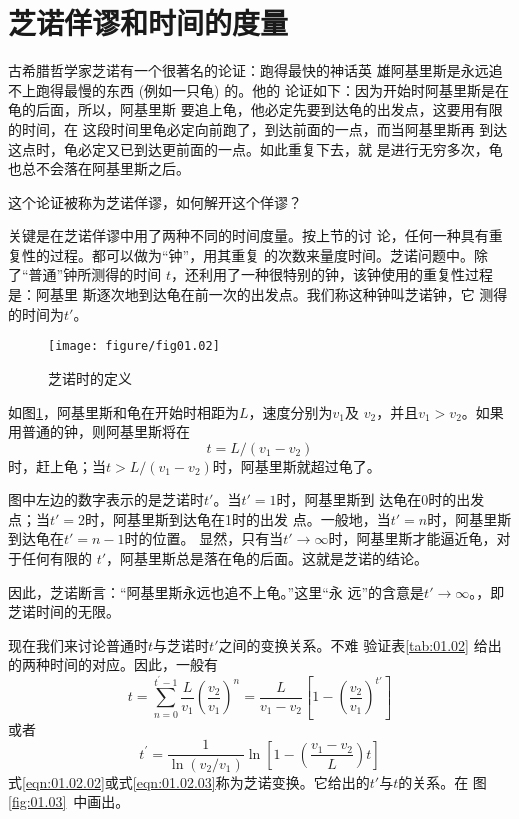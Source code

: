 \documentclass[../outline-of-mechanics.tex]{subfiles}
\begin{document}
\section{芝诺佯谬和时间的度量}\label{sec:01.02}

古希腊哲学家芝诺有一个很著名的论证：跑得最快的神话英
雄阿基里斯是永远追不上跑得最慢的东西 (例如一只龟) 的。他的
论证如下：因为开始时阿基里斯是在龟的后面，所以，阿基里斯
要追上龟，他必定先要到达龟的出发点，这要用有限的时间，在
这段时间里龟必定向前跑了，到达前面的一点，而当阿基里斯再
到达这点时，龟必定又已到达更前面的一点。如此重复下去，就
是进行无穷多次，龟也总不会落在阿基里斯之后。

这个论证被称为芝诺佯谬，如何解开这个佯谬？

关键是在芝诺佯谬中用了两种不同的时间度量。按上节的讨
论，任何一种具有重复性的过程。都可以做为“钟”，用其重复
的次数来量度时间。芝诺问题中。除了“普通”钟所测得的时间
$t$，还利用了一种很特别的钟，该钟使用的重复性过程是：阿基里
斯逐次地到达龟在前一次的出发点。我们称这种钟叫芝诺钟，它
测得的时间为$t'$。

\begin{figure}[!h]
  \centering
  \texttt{[image: figure/fig01.02]}
  \caption{芝诺时的定义}\label{fig:01.02}
\end{figure}

如图\ref{fig:01.02}，阿基里斯和龟在开始时相距为$L$，速度分别为$v_1$及
$v_2$，并且$v_1>v_2$。如果用普通的钟，则阿基里斯将在
\begin{equation}
  t=L/\left(v_1-v_2\right)
  \label{eqn:01.02.01}
\end{equation}
时，赶上龟；当$t>L/\left(v_1-v_2\right)$时，阿基里斯就超过龟了。

图中左边的数字表示的是芝诺时$t'$。当$t'=1$时，阿基里斯到
达龟在0时的出发点；当$t'=2$时，阿基里斯到达龟在1时的出发
点。一般地，当$t'=n$时，阿基里斯到达龟在$t'=n-1$时的位置。
显然，只有当$t'\to\infty$时，阿基里斯才能逼近龟，对于任何有限的
$t'$，阿基里斯总是落在龟的后面。这就是芝诺的结论。

因此，芝诺断言：“阿基里斯永远也追不上龟。”这里“永
远”的含意是$t'\to\infty$。，即芝诺时间的无限。

现在我们来讨论普通时$t$与芝诺时$t'$之间的变换关系。不难
验证表\ref{tab:01.02} 给出的两种时间的对应。因此，一般有
{\setlength{\mathindent}{4em}
\begin{equation}\label{eqn:01.02.02}
  t=\sum_{n=0}^{t^{\prime}-1} \frac{L}{v_{1}}{\left(\frac{v_{2}}{v_{1}}\right)}^{n}=\frac{L}{v_{1}-v_{2}}\left[1-{\left(\frac{v_{2}}{v_{1}}\right)}^{t'}\right]
\end{equation}}%
或者
\begin{equation}
  t^{\prime}=\frac{1}{\ln \left(v_{2} / v_{1}\right)} \ln \left[1-\left(\frac{v_{1}-v_{2}}{L}\right) t\right]
  \label{eqn:01.02.03}
\end{equation}%
式\eqref{eqn:01.02.02}或式\eqref{eqn:01.02.03}称为芝诺变换。它给出的$t'$与$t$的关系。在
图\ref{fig:01.03}~中画出。
\end{document}
